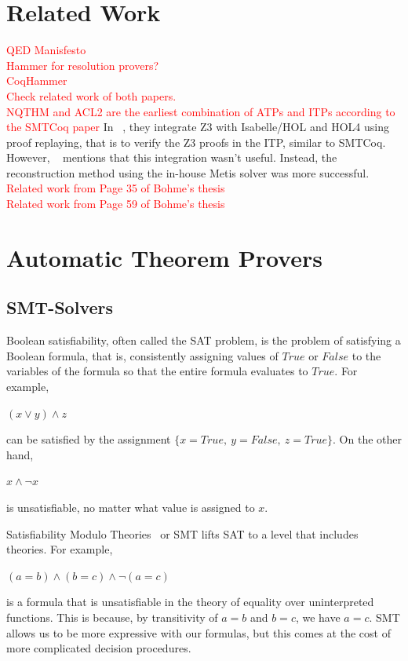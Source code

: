 \documentclass{article}
\begin{document}
\section{Related Work}
\label{sec:rel}
	\textcolor{red}{QED Manisfesto}\\
	\textcolor{red}{Hammer for resolution provers?}\\
	\textcolor{red}{CoqHammer}\\
	\textcolor{red}{Check related work of both papers.}\\
	\textcolor{red}{NQTHM and ACL2 are the earliest combination of ATPs and ITPs according to the SMTCoq paper}
	In ~\cite{10.1007/978-3-642-14052-5_14}, they integrate 
	Z3 with Isabelle/HOL and HOL4 
	using proof replaying, that is to verify 
	the Z3 proofs in the ITP, similar to SMTCoq. However, 
	~\cite{10.1007/978-3-642-22438-6_11} mentions that this
	integration wasn't useful. Instead, the reconstruction 
	method using the in-house Metis solver was more 
	successful. \\
	\textcolor{red}{Related work from Page 35 of Bohme's thesis}\\
	\textcolor{red}{Related work from Page 59 of Bohme's thesis}\\
	
\section{Automatic Theorem Provers}
\label{sec:atp}	
\subsection{SMT-Solvers}
\label{smt}
	Boolean satisfiability, often called the SAT problem, 
	is the problem of satisfying a Boolean formula, that is, 
	consistently assigning values of $True$ or $False$ 
	to the variables of the formula so that the entire 
	formula evaluates to $True$. For example,
	\begin{center}$(x \lor y) \land z$ \end{center}
	can be satisfied by the 
	assignment $\{x=True,\ y=False,\ z=True\}$. On the other hand, 
	\begin{center} $x \land \neg x$ \end{center}
	is unsatisfiable, no matter what value is assigned to $x$.
	
	Satisfiability Modulo Theories~\cite{DBLP:reference/mc/BarrettT18} 
	or SMT lifts SAT to a level that includes theories. 
	For example, 
	\begin{center} $(a = b) \land (b = c) \land \neg (a = c)$ 
	\end{center}
	is a formula that is unsatisfiable in the theory of 
	equality over uninterpreted functions. This is because, by
	transitivity of $a = b$ and $b = c$, we have $a = c$. SMT 
	allows us to be more expressive with our formulas, but 
	this comes at the cost of more complicated decision 
	procedures.
	
\end{document}
